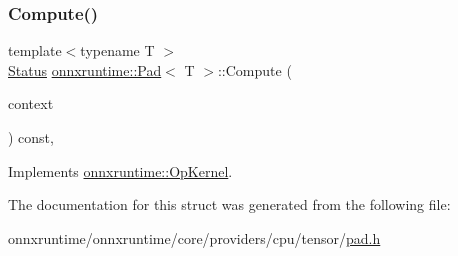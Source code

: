 \subsubsection{\texorpdfstring{Compute()}{Compute()}\hspace{0.1cm}{\footnotesize\ttfamily [2/2]}}
{\footnotesize\ttfamily template$<$typename T $>$ \\
\mbox{\hyperlink{classonnxruntime_1_1common_1_1Status}{Status}} \mbox{\hyperlink{structonnxruntime_1_1Pad}{onnxruntime\+::\+Pad}}$<$ T $>$\+::Compute (\begin{DoxyParamCaption}\item[{\mbox{\hyperlink{classonnxruntime_1_1OpKernelContext}{Op\+Kernel\+Context}} $\ast$}]{context }\end{DoxyParamCaption}) const\hspace{0.3cm}{\ttfamily [override]}, {\ttfamily [virtual]}}



Implements \mbox{\hyperlink{classonnxruntime_1_1OpKernel_a9eca8656a78b1b3ab9d3351a12798650}{onnxruntime\+::\+Op\+Kernel}}.



The documentation for this struct was generated from the following file\+:\begin{DoxyCompactItemize}
\item 
onnxruntime/onnxruntime/core/providers/cpu/tensor/\mbox{\hyperlink{cpu_2tensor_2pad_8h}{pad.\+h}}\end{DoxyCompactItemize}
